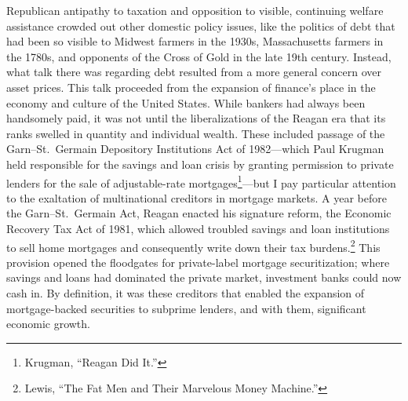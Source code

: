 \documentclass[
]{article}
\begin{document}
Republican antipathy to taxation and opposition to visible, continuing welfare assistance crowded out other domestic policy issues, like the politics of debt that had been so visible to Midwest farmers in the 1930s, Massachusetts farmers in the 1780s, and opponents of the Cross of Gold in the late 19th century.
Instead, what talk there was regarding debt resulted from a more general concern over asset prices.
This talk proceeded from the expansion of finance's place in the economy and culture of the United States.
While bankers had always been handsomely paid, it was not until the liberalizations of the Reagan era that its ranks swelled in quantity and individual wealth.
These included passage of the Garn--St.~Germain Depository Institutions Act of 1982---which Paul Krugman held responsible for the savings and loan crisis by granting permission to private lenders for the sale of adjustable-rate mortgages\footnote{Krugman, ``Reagan Did It.''}---but I pay particular attention to the exaltation of multinational creditors in mortgage markets.
A year before the Garn--St.~Germain Act, Reagan enacted his signature reform, the Economic Recovery Tax Act of 1981, which allowed troubled savings and loan institutions to sell home mortgages and consequently write down their tax burdens.\footnote{Lewis, ``The Fat Men and Their Marvelous Money Machine.''}
This provision opened the floodgates for private-label mortgage securitization; where savings and loans had dominated the private market, investment banks could now cash in.
By definition, it was these creditors that enabled the expansion of mortgage-backed securities to subprime lenders, and with them, significant economic growth.
\end{document}
